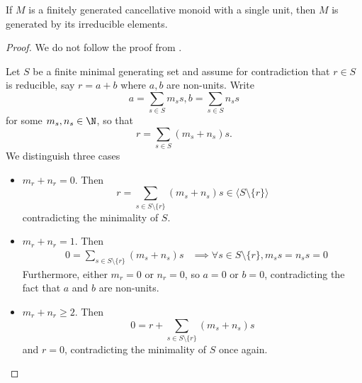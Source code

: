 \begin{proposition}
  \label{0-irred-gen}
  \leanok

  If $M$ is a finitely generated cancellative monoid with a single unit, then $M$ is generated by its irreducible elements.
\end{proposition}
\begin{proof}
  \leanok

  We do not follow the proof from \cite{Cox_2011}.

  Let $S$ be a finite minimal generating set and assume for contradiction that $r \in S$ is reducible, say $r = a + b$ where $a, b$ are non-units. Write
  \[a = \sum_{s \in S} m_s s, b = \sum_{s \in S} n_s s\]
  for some $m_s, n_s \in \N$, so that
  \[r = \sum_{s \in S} (m_s + n_s) s.\]
  We distinguish three cases
  \begin{itemize}
    \item $m_r + n_r = 0$. Then
    \[r = \sum_{s \in S \setminus \{r\}} (m_s + n_s) s \in \langle S \setminus \{r\}\rangle\]
    contradicting the minimality of $S$.
    \item $m_r + n_r = 1$. Then
    \begin{align*}
      & 0 = \sum_{s \in S \setminus \{r\}} (m_s + n_s) s
      & \implies \forall s \in S \setminus \{r\}, m_s s = n_s s = 0
    \end{align*}
    Furthermore, either $m_r = 0$ or $n_r = 0$, so $a = 0$ or $b = 0$, contradicting the fact that $a$ and $b$ are non-units.
    \item $m_r + n_r \ge 2$. Then
    \[0 = r + \sum_{s \in S \setminus \{r\}} (m_s + n_s) s\]
    and $r = 0$, contradicting the minimality of $S$ once again.
  \end{itemize}
\end{proof}
